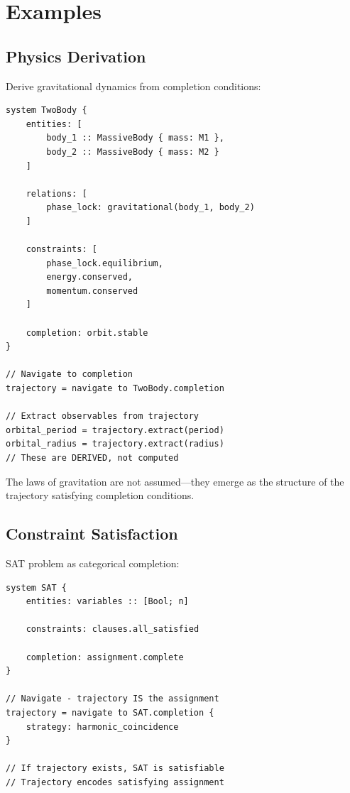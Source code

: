 \documentclass[twocolumn,10pt]{article}
\theoremstyle{remark}
\begin{document}
\section{Examples}
\label{sec:examples}

\subsection{Physics Derivation}

Derive gravitational dynamics from completion conditions:

\begin{lstlisting}
system TwoBody {
    entities: [
        body_1 :: MassiveBody { mass: M1 },
        body_2 :: MassiveBody { mass: M2 }
    ]

    relations: [
        phase_lock: gravitational(body_1, body_2)
    ]

    constraints: [
        phase_lock.equilibrium,
        energy.conserved,
        momentum.conserved
    ]

    completion: orbit.stable
}

// Navigate to completion
trajectory = navigate to TwoBody.completion

// Extract observables from trajectory
orbital_period = trajectory.extract(period)
orbital_radius = trajectory.extract(radius)
// These are DERIVED, not computed
\end{lstlisting}

The laws of gravitation are not assumed---they emerge as the structure of the trajectory satisfying completion conditions.

\subsection{Constraint Satisfaction}

SAT problem as categorical completion:

\begin{lstlisting}
system SAT {
    entities: variables :: [Bool; n]

    constraints: clauses.all_satisfied

    completion: assignment.complete
}

// Navigate - trajectory IS the assignment
trajectory = navigate to SAT.completion {
    strategy: harmonic_coincidence
}

// If trajectory exists, SAT is satisfiable
// Trajectory encodes satisfying assignment
\end{lstlisting}
\end{document}
